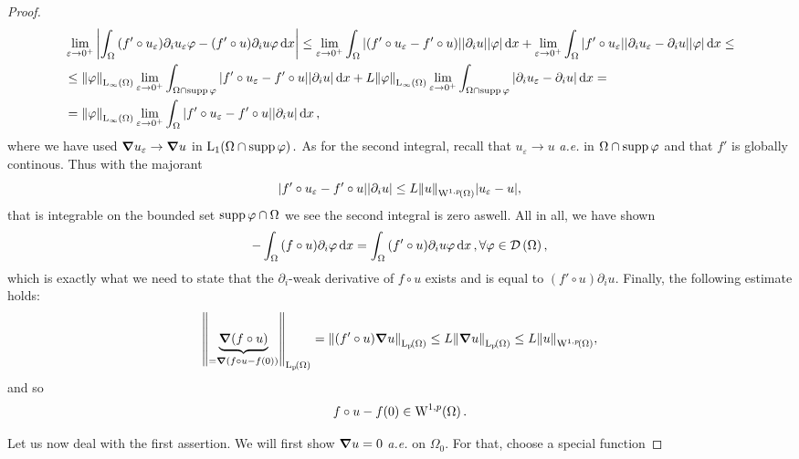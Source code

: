 \documentclass{article}
\begin{document}
\begin{proof}
\begin{align*}
	&\lim_{\varepsilon \to 0^+}\abs{\int_{\Omega}\qty(f' \circ u_{\varepsilon})\partial_{i}u_{\varepsilon}\varphi - \qty(f' \circ u)\partial_{i}u \varphi\dd{x}} \leq \lim_{\varepsilon \to 0^{+}}\int_{\Omega}\abs{\qty(f' \circ u_{\varepsilon} - f' \circ u)}|\partial_{i}u| |\varphi|\dd{x} + \lim_{\varepsilon \to 0^{+}}\int_{\Omega}\abs{f' \circ u_{\varepsilon}}\abs{\partial_{i}u_{\varepsilon} - \partial_{i}u}\abs{\varphi}\dd{x}\leq  \\
																				    &\leq \norm{\varphi}_{\text{L}_{\infty}\!\,\left(\Omega \right)}\lim_{\varepsilon \to 0^{+}}\int_{\Omega \cap \operatorname{supp} \varphi}\abs{f' \circ u_{\varepsilon} -f' \circ u}\abs{\partial_{i}u}\dd{x} + L \norm{\varphi}_{\text{L}_{\infty}\!\,\left(\Omega \right)} \lim_{\varepsilon \to 0^+} \int_{\Omega \cap \operatorname{supp} \varphi}\abs{\partial_{i}u_{\varepsilon} - \partial_{i}u}\dd{x} = \\
																				    & = \norm{\varphi}_{\text{L}_{\infty}\!\,\left(\Omega \right)}\lim_{\varepsilon \to 0^+} \int_{\Omega}\abs{f' \circ u_{\varepsilon} - f' \circ u}\abs{\partial_{i}u}\dd{x},
\end{align*}
where we have used $\grad u_{\varepsilon} \to \grad u$ in $\LpSet[1]{\Omega \cap \supp \varphi}.$ As for the second integral, recall that $u_{\varepsilon} \to u $ \textit{a.e.} in $\Omega \cap \operatorname{supp} \varphi $ and that $f'$ is globally continous. Thus with the majorant
\[
	\abs{f' \circ u_{\varepsilon}- f' \circ u}|\partial_{i} u| \leq L \norm{u}_{\WkpSet[1][p]{\Omega}} \abs{u_{\varepsilon} - u},
\]
that is integrable on the bounded set $\operatorname{supp} \varphi \cap \Omega$ we see the second integral is zero aswell. All in all, we have shown
\[
	- \int_{\Omega}\qty(f \circ u)\partial_{i}\varphi\dd{x} = \int_{\Omega}\qty(f' \circ u)\partial_{i}u \varphi\dd{x}, \forall \varphi \in \mathcal{D}\!\,\left(\Omega \right),
\]
which is exactly what we need to state that the $\partial_{i}$-weak derivative of $f \circ u$ exists and is equal to $(f' \circ u) \partial_{i}u$. Finally, the following estimate holds:
\[
	\norm{\underbrace{\grad\qty(f \circ u)}_{= \grad\qty(f \circ u - f(0))}}_{\LpSet{\Omega}} = \norm{\qty(f' \circ u)\grad u}_{\LpSet{\Omega}} \leq L \norm{\grad u}_{\LpSet{\Omega}} \leq L \norm{u}_{\WkpSet[1][p]{\Omega}},
\]
and so
\[
	f\circ u - f(0) \in \WkpSet[1][p]{\Omega}.
\]

Let us now deal with the first assertion. We will first show $\grad u = 0$ \textit{a.e.} on $\Omega_0$. For that, choose a special function


\end{proof}
\end{document}
